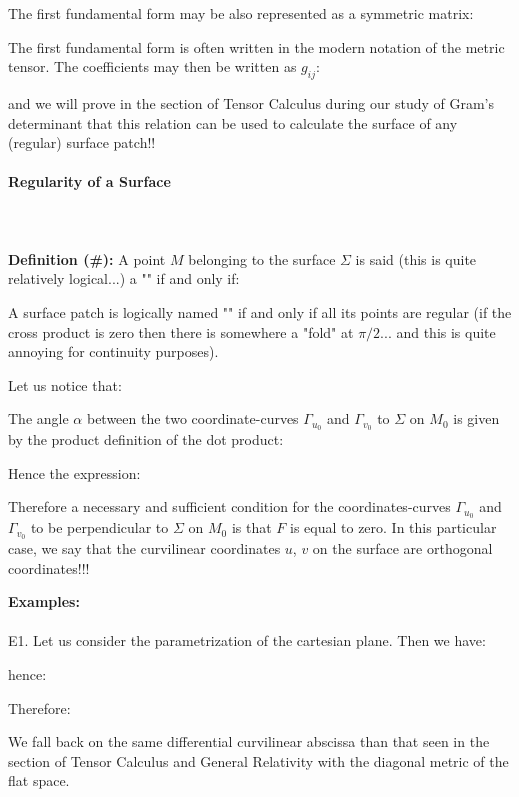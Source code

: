 {	The first fundamental form may be also represented as a symmetric matrix:
	
	The first fundamental form is often written in the modern notation of the metric tensor. The coefficients may then be written as $g_{ij}$:
	
	and we will prove in the section of Tensor Calculus during our study of Gram's determinant that this relation can be used to calculate the surface of any (regular) surface patch!!
	
	\pagebreak
	\paragraph{Regularity of a Surface}\mbox{}\\\\
	\textbf{Definition (\#\mydef):} A point $M$ belonging to the surface $\Sigma$ is said (this is quite relatively logical...) a "" if and only if:
	
	A surface patch is logically named "" if and only if all its points are regular (if the cross product is zero then there is somewhere a "fold" at $\pi/2$... and this is quite annoying for continuity purposes).

	Let us notice that:
	
	The angle $\alpha$ between the two coordinate-curves $\Gamma_{u_0}$ and $\Gamma_{v_0}$ to $\Sigma$ on $M_0$ is given by the product definition of the dot product:
	
		Hence the expression:
	
	Therefore a necessary and sufficient condition for the coordinates-curves $\Gamma_{u_0}$ and $\Gamma_{v_0}$ to be perpendicular to $\Sigma$ on $M_0$ is that $F$ is equal to zero. In this particular case, we say that the curvilinear coordinates $u$, $v$ on the surface are orthogonal coordinates!!!
	\begin{tcolorbox}[colframe=black,colback=white,sharp corners]
	\textbf{{\Large {}}Examples:}\\\\
	E1. Let us consider the parametrization of the cartesian plane. Then we have:
	
	hence:
	
	Therefore:
	
	We fall back on the same differential curvilinear abscissa than that seen in the section of Tensor Calculus and General Relativity with the diagonal metric of the flat space.
	

\end{tcolorbox}}
